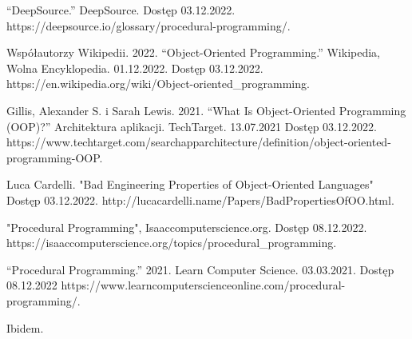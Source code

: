 \newpage

\begin{thebibliography}{}


\begin{flushleft}
    “DeepSource.” DeepSource. Dostęp 03.12.2022. https://deepsource.io/glossary/procedural-programming/.
\end{flushleft}


\begin{flushleft}
    Współautorzy Wikipedii. 2022. “Object-Oriented Programming.” Wikipedia, Wolna Encyklopedia. 01.12.2022. Dostęp 03.12.2022. https://en.wikipedia.org/wiki/Object-oriented\_programming.
\end{flushleft}


\begin{flushleft}
    Gillis, Alexander S. i Sarah Lewis. 2021. “What Is Object-Oriented Programming (OOP)?” Architektura aplikacji. TechTarget. 13.07.2021 Dostęp 03.12.2022. https://www.techtarget.com/searchapparchitecture/definition/object-oriented-programming-OOP.
\end{flushleft}


\begin{flushleft}
    Luca Cardelli. "Bad Engineering Properties of Object-Oriented Languages" Dostęp 03.12.2022. http://lucacardelli.name/Papers/BadPropertiesOfOO.html.
\end{flushleft}


\begin{flushleft}
    "Procedural Programming", Isaaccomputerscience.org. Dostęp 08.12.2022. https://isaaccomputerscience.org/topics/procedural\_programming.
\end{flushleft}


\begin{flushleft}
    “Procedural Programming.” 2021. Learn Computer Science. 03.03.2021. Dostęp 08.12.2022 https://www.learncomputerscienceonline.com/procedural-programming/.
\end{flushleft}


\begin{flushleft}
    Ibidem.
\end{flushleft}


\end{thebibliography}
